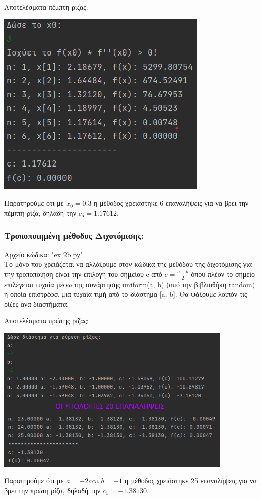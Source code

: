 \documentclass{article}
\begin{document}
    \pagebreak
    \vspace{3mm}
    Αποτελέσματα πέμπτη ρίζας: \\
    \begin{center}\includegraphics[]{images/results_12.png}\end{center}
    Παρατηρούμε ότι με \(x_0 = 0.3\) η μέθοδος χρειάστηκε 6 επαναλήψεις για να βρει την πέμπτη ρίζα, δηλαδή την \(c_5 = 1.17612\). 
    
    
    \subsubsection{Τροποποιημένη μέθοδος Διχοτόμισης:}
    Αρχείο κώδικα: "ex 2b.py" \\
    Το μόνο που χρειάζεται να αλλάξουμε στον κώδικα της μεθόδου της διχοτόμισης για την τροποποίηση είναι την επιλογή του σημείου c από \(c = \frac{a+b}{2}\) όπου πλέον το σημείο επιλέγεται τυχαία μέσω της συνάρτησης uniform(a, b) (από την βιβλιοθήκη random) η οποία επιστρέφει μια τυχαία τιμή από το διάστημα [a, b]. Θα ψάξουμε λοιπόν τις ρίζες ανα διαστήματα.
    
    \pagebreak
    Αποτελέσματα πρώτης ρίζας: \\
    \begin{center}\includegraphics[height = 7cm]{images/results_13.png}\end{center}
    Παρατηρούμε ότι με \(a = -2 \text{και } b = -1\) η μέθοδος χρειάστηκε 25 επαναλήψεις για να βρει την πρώτη ρίζα, δηλαδή την \(c_1 = -1.38130\). 
    
\end{document}
